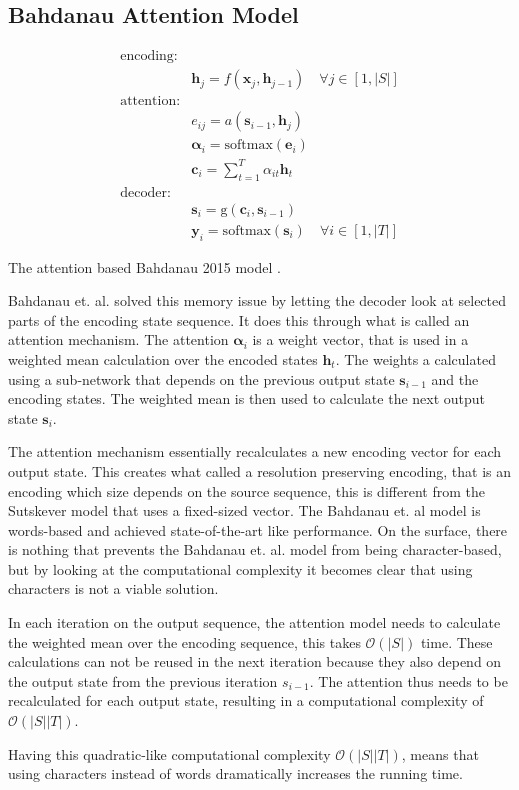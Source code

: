 \subsection{Bahdanau Attention Model}
\label{sec:theory:sequential:bahdanau}

\begin{equationbox}[H]
\begin{equation*}
\begin{aligned}
\text{encoding:} & \\
& \mathbf{h}_j = f(\mathbf{x}_j, \mathbf{h}_{j-1}) \quad \forall j \in [1, |S|] \\
\text{attention:} & \\
& e_{ij} = a(\mathbf{s}_{i-1}, \mathbf{h}_j) \\
& \bm{\alpha}_i = \mathrm{softmax}(\mathbf{e}_i) \\
& \mathbf{c}_i = {\textstyle \sum_{t=1}^T} \alpha_{it} \mathbf{h}_t \\
\text{decoder:} & \\
&\mathbf{s}_i = \mathrm{g}(\mathbf{c}_i, \mathbf{s}_{i-1}) \\
&\mathbf{y}_i = \mathrm{softmax}(\mathbf{s}_i) \quad \forall i \in [1, |T|]
\end{aligned}
\end{equation*}
\caption{The attention based Bahdanau 2015 model \cite{bahdanau-2015-nmt}.}
\end{equationbox}

Bahdanau et. al. solved this memory issue by letting the decoder look at selected parts of the encoding state sequence. It does this through what is called an attention mechanism. The attention $\bm{\alpha}_i$ is a weight vector, that is used in a weighted mean calculation over the encoded states $\mathbf{h}_t$. The weights a calculated using a sub-network that depends on the previous output state $\mathbf{s}_{i-1}$ and the encoding states. The weighted mean is then used to calculate the next output state $\mathbf{s}_{i}$.

The attention mechanism essentially recalculates a new encoding vector for each output state. This creates what called a resolution preserving encoding, that is an encoding which size depends on the source sequence, this is different from the Sutskever model that uses a fixed-sized vector. The Bahdanau et. al model is words-based and achieved state-of-the-art like performance. On the surface, there is nothing that prevents the Bahdanau et. al. model from being character-based, but by looking at the computational complexity it becomes clear that using characters is not a viable solution.

In each iteration on the output sequence, the attention model needs to calculate the weighted mean over the encoding sequence, this takes $\mathcal{O}(|S|)$ time. These calculations can not be reused in the next iteration because they also depend on the output state from the previous iteration $s_{i-1}$. The attention thus needs to be recalculated for each output state, resulting in a computational complexity of $\mathcal{O}(|S||T|)$.

Having this quadratic-like computational complexity $\mathcal{O}(|S||T|)$, means that using characters instead of words dramatically increases the running time.
